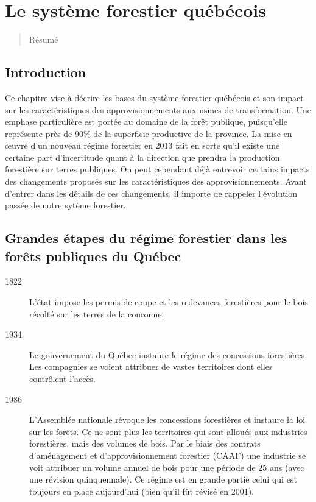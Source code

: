 \chapter{Le système forestier québécois}

\begin{abstract}
Résumé
\end{abstract}

\minitoc

\section{Introduction}

Ce chapitre vise à décrire les bases du système forestier québécois et son impact sur les caractéristiques des approvisionnements aux usines de transformation. Une emphase particulière est portée au domaine de la forêt publique, puisqu'elle représente près de 90\% de la superficie productive de la province. La mise en œuvre d'un nouveau régime forestier en 2013 fait en sorte qu'il existe une certaine part d'incertitude quant à la direction que prendra la production forestière sur terres publiques. On peut cependant déjà entrevoir certains impacts des changements proposés sur les caractéristiques des approvisionnements. Avant d'entrer dans les détails de ces changements, il importe de rappeler l'évolution passée de notre sytème forestier.

\section{Grandes étapes du régime forestier dans les forêts publiques du Québec}

\begin{description}
\item[1822] L'état impose les permis de coupe et les redevances forestières pour le bois récolté sur les terres de la couronne. 
\item[1934] Le gouvernement du Québec instaure le régime des concessions forestières. Les compagnies se voient attribuer de vastes territoires dont elles contrôlent l'accès.
\item[1986] L'Assemblée nationale révoque les concessions forestières et instaure la loi sur les forêts. Ce ne sont plus les territoires qui sont alloués aux industries forestières, mais des volumes de bois. Par le biais des contrats d'aménagement et d'approvisionnement forestier (CAAF) une industrie se voit attribuer un volume annuel de bois pour une période de 25 ans (avec une révision quinquennale). Ce régime est en grande partie celui qui est toujours en place aujourd'hui (bien qu'il fût révisé en 2001). 

\end{description}

